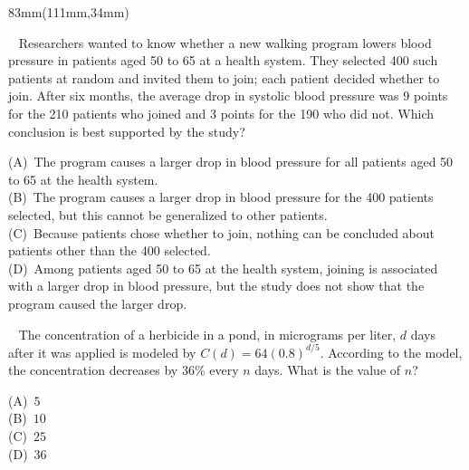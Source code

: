 \documentclass[a4paper]{article}
\newcommand{\RCOL}{111mm}
\newcommand{\COLW}{83mm}
\newcommand{\pnum}[1]{\fcolorbox{ink}{white}{\sffamily\bfseries\fontsize{8}{8}\selectfont #1}~}
\begin{document}
\begin{textblock*}{\COLW}(\RCOL,34mm)
{\fontsize{10.4}{13.4}\selectfont
\parbox[t][233mm][t]{\COLW}{%
\noindent\pnum{13} Researchers wanted to know whether a new walking program lowers blood pressure in patients aged 50 to 65 at a health system. They selected 400 such patients at random and invited them to join; each patient decided whether to join. After six months, the average drop in systolic blood pressure was 9 points for the 210 patients who joined and 3 points for the 190 who did not. Which conclusion is best supported by the study?\par\vspace{2.2mm}
\hspace*{7mm}(A)\ The program causes a larger drop in blood pressure for all patients aged 50 to 65 at the health system.\\[1.8mm]
\hspace*{7mm}(B)\ The program causes a larger drop in blood pressure for the 400 patients selected, but this cannot be generalized to other patients.\\[1.8mm]
\hspace*{7mm}(C)\ Because patients chose whether to join, nothing can be concluded about patients other than the 400 selected.\\[1.8mm]
\hspace*{7mm}(D)\ Among patients aged 50 to 65 at the health system, joining is associated with a larger drop in blood pressure, but the study does not show that the program caused the larger drop.
\vfill

\noindent\pnum{14} The concentration of a herbicide in a pond, in micrograms per liter, $d$ days after it was applied is modeled by $C(d)=64(0.8)^{d/5}$. According to the model, the concentration decreases by 36\% every $n$ days. What is the value of $n$?\par\vspace{2.2mm}
\hspace*{7mm}(A)\ $5$\\[1.8mm]
\hspace*{7mm}(B)\ $10$\\[1.8mm]
\hspace*{7mm}(C)\ $25$\\[1.8mm]
\hspace*{7mm}(D)\ $36$
\vfill

}}
\end{textblock*}
\end{document}
